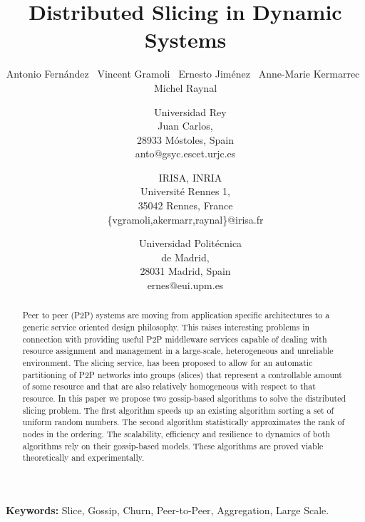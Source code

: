 \documentclass[times,10pt,twocolumn]{article}
\begin{document}
\title{Distributed Slicing in Dynamic Systems}

\author{Antonio Fern\'andez\footnotemark[1] ~
Vincent Gramoli\footnotemark[2] ~
Ernesto Jim\'enez\footnotemark[3] ~
Anne-Marie Kermarrec\footnotemark[2] ~
Michel Raynal\footnotemark[2]\\
\and
\footnotemark[1]{}~~Universidad Rey\\ Juan Carlos,\\ 28933 M\'ostoles, Spain\\ anto@gsyc.escet.urjc.es
\and
\footnotemark[2]{}~~IRISA, INRIA\\ Universit\'e Rennes 1,\\ 35042 Rennes, France\\ \{vgramoli,akermarr,raynal\}@irisa.fr
\and
\footnotemark[3]{}~~Universidad Polit\'ecnica\\ de Madrid,\\ 28031 Madrid, Spain\\ ernes@eui.upm.es
}

\maketitle
\thispagestyle{empty}

\begin{abstract}
 	Peer to peer (P2P) systems are moving from application specific architectures to 
	a generic service oriented design philosophy.
	This raises interesting problems in connection with providing useful
	P2P middleware services 
	capable of dealing with resource assignment
	and management in a large-scale, heterogeneous and unreliable environment.
	The slicing service, has been proposed to allow for an
	automatic partitioning of P2P networks into groups (slices) that
	represent a controllable amount of some resource and that are also relatively
	homogeneous with respect to that resource.
	In this paper we propose two gossip-based algorithms to solve the distributed slicing problem.
	The first algorithm speeds up an existing algorithm 
	sorting a set of uniform random numbers.
	The second algorithm 
	statistically  approximates
	the rank of nodes in the ordering.
	The scalability, efficiency and resilience to dynamics of both algorithms 
	rely on their gossip-based models.
	These algorithms are proved viable theoretically and experimentally.
\end{abstract}


\noindent
{\bf Keywords:} Slice, Gossip, Churn, Peer-to-Peer, Aggregation, Large Scale. 
\end{document}
